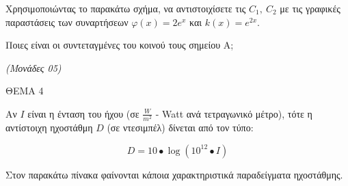 \documentclass[11pt,a4paper,twoside]{book}
\newcommand{\monades}[1]{\hfill \textit{(Μονάδες #1)}}
\begin{document}
\begin{alist}
\item
  Χρησιμοποιώντας το παρακάτω σχήμα, να αντιστοιχίσετε τις $C_{1},\ C_{2}$ με τις γραφικές παραστάσεις των συναρτήσεων $\varphi(x) = 2e^{x}$ και $k(x) = e^{2x}$.

Ποιες είναι οι συντεταγμένες του κοινού τους σημείου Α;


\begin{center}


\end{center}


\monades{05}
\end{alist}

\vspace{4mm}

ΘΕΜΑ 4

Αν $I$ είναι η ένταση του ήχου (σε $\frac{W}{m^{2}}$ - Watt ανά τετραγωνικό μέτρο), τότε η αντίστοιχη ηχοστάθμη $D$ (σε ντεσιμπέλ) δίνεται από τον τύπο:

\begin{equation*}D = 10 \bullet \log\left( 10^{12} \bullet I \right)\end{equation*}

Στον παρακάτω πίνακα φαίνονται κάποια χαρακτηριστικά παραδείγματα ηχοστάθμης.
\end{document}
